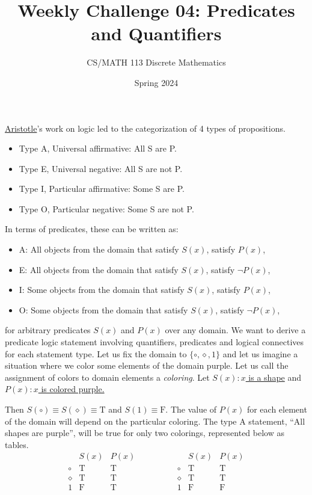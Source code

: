 \documentclass[a4paper]{exam}
\title{Weekly Challenge 04: Predicates and Quantifiers}
\author{CS/MATH 113 Discrete Mathematics}
\date{Spring 2024}
\newcommand\T{\ensuremath{\mathrm{T}}}
\newcommand\F{\ensuremath{\mathrm{F}}}
\begin{document}
\maketitle
\begin{questions}
  \href{https://en.wikipedia.org/wiki/Aristotle}{Aristotle}'s work on logic led to the categorization of 4 types of propositions.
  \begin{itemize}
  \item Type A, Universal affirmative: All S are P.
  \item Type E, Universal negative: All S are not P.
  \item Type I, Particular affirmative: Some S are P.
  \item Type O, Particular negative: Some S are not P.
  \end{itemize}
  In terms of predicates, these can be written as:
  \begin{itemize}
  \item A: All objects from the domain that satisfy $S(x)$, satisfy $P(x)$,
  \item E: All objects from the domain that satisfy $S(x)$, satisfy $\neg P(x)$,
  \item I: Some objects from the domain that satisfy $S(x)$, satisfy $P(x)$,
  \item O: Some objects from the domain that satisfy $S(x)$, satisfy $\neg P(x)$,
  \end{itemize}
  for arbitrary predicates $S(x)$ and $P(x)$ over any domain.
  We want to derive a predicate logic statement involving quantifiers, predicates and logical connectives for each statement type.
  Let us fix the domain to $\{\circ,\diamond,1\}$ and let us imagine a situation where we color some elements of the domain purple. Let us call the assignment of colors to domain elements a \textit{coloring}.
  Let \underline{$S(x): x$ is a shape} and \underline{$P(x): x$ is colored purple.}
  
  Then $S(\circ)\equiv S(\diamond)\equiv\T$ and $S(1)\equiv\F$. The value of $P(x)$ for each element of the domain will depend on the particular coloring.
    The type A statement, ``All shapes are purple'', will be true for only two colorings, represented below as tables.
  \[
    \begin{array}{c|cc}
      & S(x) & P(x) \\\hline
      \circ & \T & \T \\
      \diamond & \T & \T \\
      1 & \F & \T \\
    \end{array}
    \hspace{50pt} %
    \begin{array}{c|cc}
      & S(x) & P(x) \\\hline
      \circ & \T & \T \\
      \diamond & \T & \T \\
      1 & \F & \F \\
    \end{array}
\]
  

\end{questions}
\end{document}

